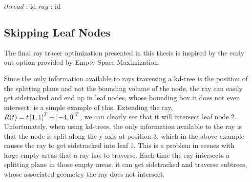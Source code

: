 \begin{algorithm}
  \caption{Converting a thread id to a ray id.}
  \label{alg:packet}
  \begin{algorithmic}
              {$thread$ : id}
              {$ray$ : id}
              {
              }
  \end{algorithmic}
\end{algorithm}


\subsection{Skipping Leaf Nodes}


The final ray tracer optimization presented in this thesis is inspired by the
early out option provided by Empty Space Maximization.


Since the only information available to rays traversing a kd-tree is the
position of the splitting plane and not the bounding volume of the node, the ray
can easily get sidetracked and end up in leaf nodes, whose bounding box it does
not even intersect.  is a simple example of
this. Extending the ray, $R(t) = t \left[1, 1 \right]^T + \left[-4, 0 \right]^T$, we can
clearly see that it will intersect leaf node 2. Unfortunately, when using
kd-trees, the only information available to the ray is that the node is split
along the y-axis at position 3, which in the above example causes the ray to get
sidetracked into leaf 1. This is a problem in scenes with large empty areas that
a ray has to traverse. Each time the ray intersects a splitting plane in those
empty areas, it can get sidetracked and traverse subtrees, whose associated
geometry the ray does not intersect.


